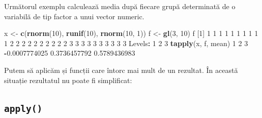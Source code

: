 \documentclass[]{article}
\newenvironment{Shaded}{\begin{snugshade}}{\end{snugshade}}
\newcommand{\KeywordTok}[1]{\textcolor[rgb]{0.13,0.29,0.53}{\textbf{#1}}}
\newcommand{\DataTypeTok}[1]{\textcolor[rgb]{0.13,0.29,0.53}{#1}}
\newcommand{\DecValTok}[1]{\textcolor[rgb]{0.00,0.00,0.81}{#1}}
\newcommand{\FloatTok}[1]{\textcolor[rgb]{0.00,0.00,0.81}{#1}}
\newcommand{\StringTok}[1]{\textcolor[rgb]{0.31,0.60,0.02}{#1}}
\newcommand{\OperatorTok}[1]{\textcolor[rgb]{0.81,0.36,0.00}{\textbf{#1}}}
\newcommand{\NormalTok}[1]{#1}
\begin{document}
Următorul exemplu calculează media după fiecare grupă determinată de o
variabilă de tip factor a unui vector numeric.

\begin{Shaded}
\begin{Highlighting}[]
\NormalTok{x <-}\StringTok{ }\KeywordTok{c}\NormalTok{(}\KeywordTok{rnorm}\NormalTok{(}\DecValTok{10}\NormalTok{), }\KeywordTok{runif}\NormalTok{(}\DecValTok{10}\NormalTok{), }\KeywordTok{rnorm}\NormalTok{(}\DecValTok{10}\NormalTok{, }\DecValTok{1}\NormalTok{))}
\NormalTok{f <-}\StringTok{ }\KeywordTok{gl}\NormalTok{(}\DecValTok{3}\NormalTok{, }\DecValTok{10}\NormalTok{)   }
\NormalTok{f}
\NormalTok{ [}\DecValTok{1}\NormalTok{] }\DecValTok{1} \DecValTok{1} \DecValTok{1} \DecValTok{1} \DecValTok{1} \DecValTok{1} \DecValTok{1} \DecValTok{1} \DecValTok{1} \DecValTok{1} \DecValTok{2} \DecValTok{2} \DecValTok{2} \DecValTok{2} \DecValTok{2} \DecValTok{2} \DecValTok{2} \DecValTok{2} \DecValTok{2} \DecValTok{2} \DecValTok{3} \DecValTok{3} \DecValTok{3} \DecValTok{3} \DecValTok{3} \DecValTok{3} \DecValTok{3} \DecValTok{3} \DecValTok{3} \DecValTok{3}
\NormalTok{Levels}\OperatorTok{:}\StringTok{ }\DecValTok{1} \DecValTok{2} \DecValTok{3}
\KeywordTok{tapply}\NormalTok{(x, f, mean)}
            \DecValTok{1}             \DecValTok{2}             \DecValTok{3} 
\OperatorTok{-}\FloatTok{0.0007774025}  \FloatTok{0.3736457792}  \FloatTok{0.5789436983} 
\end{Highlighting}
\end{Shaded}

Putem să aplicăm și funcții care întorc mai mult de un rezultat. În
această situație rezultatul nu poate fi simplificat:

\begin{Shaded}
\end{Shaded}

\subsection{\texorpdfstring{\texttt{apply()}}{apply()}}\label{apply}
\end{document}
